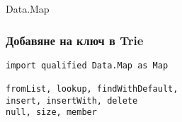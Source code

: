 \documentclass{beamer}
\begin{document}
\begin{frame}[fragile]
\begin{columns}[t]
\begin{column}{0.80\textwidth}
  \end{column}
\end{columns}

\end{frame}


\begin{frame}
  \centerline{Data.Map}
\end{frame}

\begin{frame}[fragile]
  \frametitle{Добавяне на ключ в Trie}
\begin{verbatim}
import qualified Data.Map as Map

fromList, lookup, findWithDefault, 
insert, insertWith, delete
null, size, member
\end{verbatim}
\end{frame}


\end{document}
